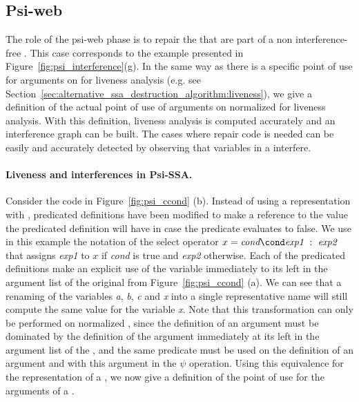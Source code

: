
\subsection{Psi-web}

The role of the psi-web phase is to repair the \psifuns that are part of a non interference-free \psiweb. 
This case corresponds to the example presented in
Figure~\ref{fig:psi_interference}(g).
%
In the same way as there is a specific point of use for arguments on
\phifuns for liveness analysis (e.g. see Section~\ref{sec:alternative_ssa_destruction_algorithm:liveness}), we give a definition of the
actual point of use of arguments on normalized \psifuns for liveness
analysis. With this definition, liveness analysis is computed
accurately and an interference graph can be built. The cases where repair code is needed can be easily and
accurately detected by observing that variables in a
\psifun interfere.

\paragraph{Liveness and interferences in Psi-SSA.}
Consider the code in Figure~\ref{fig:psi_ccond} (b). Instead of using
a representation with \psifuns, predicated definitions have
been modified to make a reference to the value the predicated
definition will have in case the predicate evaluates to false. We use in this
example the notation of the select operator
$x = \textit{cond}\cond \textit{exp1}~:~\textit{exp2}$ that assigns \textit{exp1} to $x$ if \textit{cond} is true and \textit{exp2} otherwise. 
Each of the predicated definitions make an
explicit use of the variable immediately to its left in the argument
list of the original \psifun from Figure~\ref{fig:psi_ccond}
(a). We can see that a renaming of the variables \textit{a}, \textit{b},
\textit{c} and \textit{x} into a single representative name will still
compute the same value for the variable \textit{x}. Note that this
transformation can only be performed on normalized \psifuns,
since the definition of an argument must be dominated by the
definition of the argument immediately at its left in the argument
list of the \psifun, and the same predicate must be used on the
 definition of an argument and with this argument in the $\psi$ operation.
Using this equivalence for the
representation of a \psifun, we now give a definition of the
point of use for the arguments of a \psifun.

